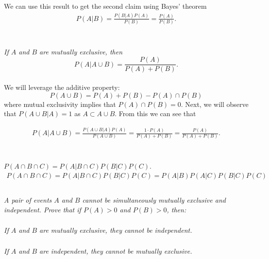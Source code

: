 \documentclass[12pt]{amsart}
\begin{document}
		We can use this result to get the second claim using Bayes' theorem
		\begin{align*}
			P(A|B) 
			= \frac{P(B|A)P(A)}{P(B)}
			= \frac{P(A)}{P(B)}.
		\end{align*} \\
	
	\subsubsection{} \textit{If \(A\) and \(B\) are mutually exclusive, then}
		\[ P(A|A\cup B) = \frac{P(A)}{P(A) + P(B)}. \] \\
		
		We will leverage the additive property: 
		\[P(A\cup B) = P(A) + P(B) - P(A)\cap P(B)\]
		where mutual exclusivity implies that \(P(A)\cap P(B) = 0\).
		Next, we will observe that \(P(A\cup B|A)=1\) as \(A\subset A\cup B\). From this we can see that 
		
		\begin{align*}
			P(A|A\cup B) = \frac{P(A\cup B|A)P(A)}{P(A\cup B)}
			= \frac{1\cdot P(A)}{P(A) + P(B)}
			= \frac{P(A)}{P(A) + P(B)}.
		\end{align*} \\[1em]
		 
	\subsubsection{} \(P(A\cap B\cap C) = P(A|B\cap C) P(B|C) P(C)\). \\
	
	\begin{align*}
		P(A\cap B\cap C) 
		= P(A|B\cap C) P(B|C) P(C)
		= P(A|B) P(A|C) P(B|C) P(C)
	\end{align*}

\subsection{} %
\textit{A pair of events \(A\) and \(B\) cannot be simultaneously mutually exclusive and independent.
	Prove that if \(P(A) > 0\) and \(P(B) > 0\), then:}
	\subsubsection{} \textit{If \(A\) and \(B\) are mutually exclusive, they cannot be independent.}
	\subsubsection{} \textit{If \(A\) and \(B\) are independent, they cannot be mutually exclusive.}
\end{document}
